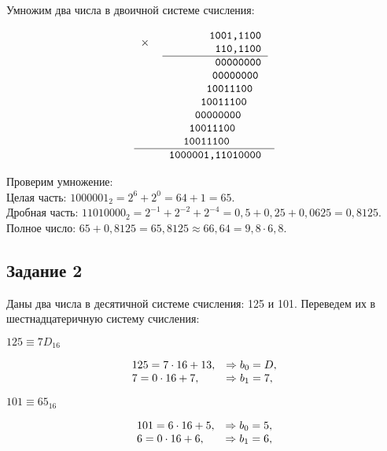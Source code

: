 \documentclass[a4paper,14pt]{extarticle}
\begin{document}
	Умножим два числа в двоичной системе счисления:
	
	\[
	\begin{tabular}{{c}{c}}
		\texttt{$\times$}&
		\begin{tabular}{c}
			\texttt{~~~~~~~1001,1100}\\
			\texttt{~~~~~~~~110,1100}\\
			\hline
		\end{tabular}\\
		& \texttt{~~~~~~~~00000000}\\
		& \texttt{~~~~~~~00000000~}\\
		& \texttt{~~~~~~10011100~~}\\
		& \texttt{~~~~~10011100~~~}\\
		& \texttt{~~~~00000000~~~~}\\
		& \texttt{~~~10011100~~~~~}\\
		& \texttt{~~10011100~~~~~~}\\
		\hline
		& \texttt{1000001,11010000}
	\end{tabular}
	\]
	
	Проверим умножение:\\
	Целая часть: $1000001_{2}=2^{6}+2^{0}=64+1=65$. \\
	Дробная часть: $11010000_{2}=2^{-1}+2^{-2}+2^{-4}=0,5+0,25+0,0625=0,8125$.
	Полное число: $65+0,8125=65,8125 \approx 66,64=9,8 \cdot 6,8$.
	
	\subsection*{Задание 2}
	
	Даны два числа в десятичной системе счисления: 125 и 101. Переведем их в шестнадцатеричную систему счисления:
	
	$125 \equiv 7D_{16}$
	
	\[
	\begin{array}[c]{ll}
		125 = 7 \cdot 16 + 13, &\Rightarrow b_{0} = D,\\
		7 = 0 \cdot 16 + 7, &\Rightarrow b_{1} = 7,\\
	\end{array}
	\]
	
	\pagebreak
	
	$101 \equiv 65_{16}$
	
	\[
	\begin{array}[c]{ll}
		101 = 6 \cdot 16 + 5, &\Rightarrow b_{0} = 5,\\
		6 = 0 \cdot 16 + 6, &\Rightarrow b_{1} = 6,\\
	\end{array}
	\]
	
\end{document}
